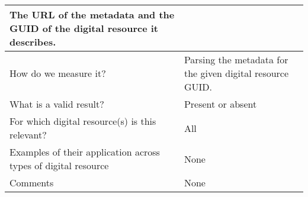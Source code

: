 \documentclass[english]{article}
\begin{document}
\begin{longtable}{|p{5cm}|p{9cm}|}
The URL of the metadata and the GUID of the digital resource it describes.


 \\



\hline
How do we measure it? &  

Parsing the metadata for the given digital resource GUID.

\\



\hline
What is a valid result? &  


Present or absent


\\



\hline
For which digital resource(s) is this relevant? &  All\\



\hline
Examples of their application across types of digital resource &  

None


\\



\hline

Comments & 


None

 \\ 
\hline

\end{longtable}
\end{document}
